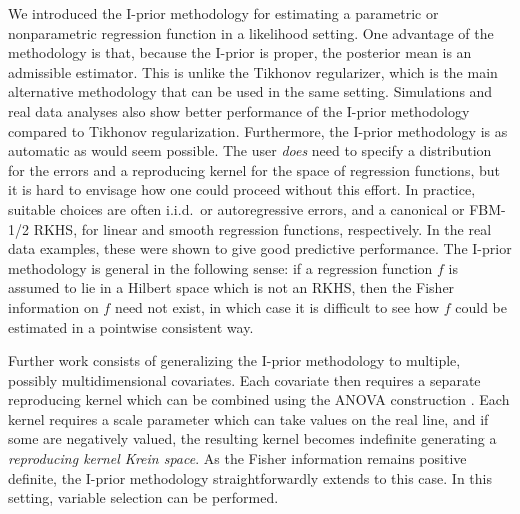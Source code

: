 \documentclass[preprint,12pt,authoryear]{elsarticle}
\begin{document}
We introduced the I-prior methodology for estimating a parametric or nonparametric regression function in a likelihood setting. One advantage of the methodology is that, because the I-prior is proper, the posterior mean is an admissible estimator. This is unlike the Tikhonov regularizer, which is the main alternative methodology that can be used in the same setting. Simulations and real data analyses also show better performance of the I-prior methodology compared to Tikhonov regularization. 
Furthermore, the I-prior methodology is as automatic as would seem possible. The user {\em does} need to specify a distribution for the errors and a reproducing kernel for the space of regression functions, but it is hard to envisage how one could proceed without this effort. In practice, suitable choices are often i.i.d.\  or autoregressive errors, and a canonical or FBM-1/2 RKHS, for linear and smooth regression functions, respectively. In the real data examples, these were shown to give good predictive performance. 
The I-prior methodology is general in the following sense: if a regression function $f$ is assumed to lie in a Hilbert space which is not an RKHS, then the Fisher information on $f$ need not exist, in which case it is difficult to see how $f$ could be estimated in a pointwise consistent way. 


Further work consists of generalizing the I-prior methodology to multiple, possibly multidimensional covariates. Each covariate then requires a separate reproducing kernel which can be combined using the ANOVA construction \citep{wahba90anova,gw93}.  Each kernel requires a scale parameter which can take values on the real line, and if some are negatively valued, the resulting kernel becomes indefinite generating a {\em reproducing kernel Krein space}. As the Fisher information remains positive definite, the I-prior methodology straightforwardly extends to this case. In this setting, variable selection can be performed.










\appendix
\end{document}
